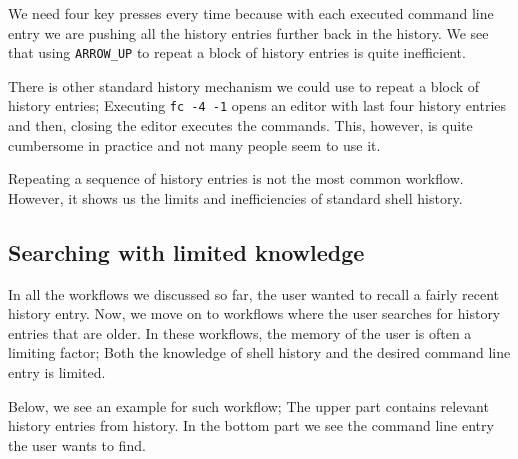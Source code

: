 We need four key presses every time because with each executed command line entry we are pushing all the history entries further back in the history. We see that using \verb|ARROW_UP| to repeat a block of history entries is quite inefficient.  

There is other standard history mechanism we could use to repeat a block of history entries; 
Executing \verb|fc -4 -1| opens an editor with last four history entries and then, closing the editor executes the commands. This, however, is quite cumbersome in practice and not many people seem to use it. 


Repeating a sequence of history entries is not the most common workflow. However, it shows us the limits and inefficiencies of standard shell history.


\subsection{Searching with limited knowledge}\label{workflow-search-w-limited-knowledge}

In all the workflows we discussed so far, the user wanted to recall a fairly recent history entry. Now, we move on to workflows where the user searches for history entries that are older. In these workflows, the memory of the user is often a limiting factor; Both the knowledge of shell history and the desired command line entry is limited.

Below, we see an example for such workflow; The upper part contains relevant history entries from history. In the bottom part we see the command line entry the user wants to find. 



        
